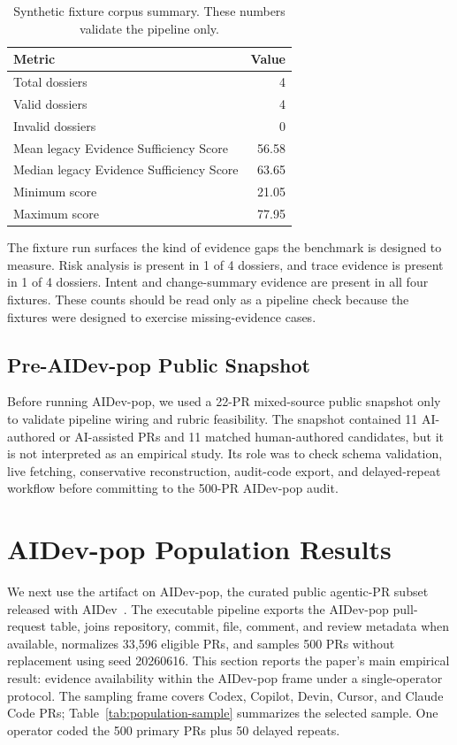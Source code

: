 \documentclass[10pt,conference]{IEEEtran}
\begin{document}
\begin{table}[t]
\centering
\caption{Synthetic fixture corpus summary. These numbers validate the pipeline only.}
\label{tab:seed-summary}
\footnotesize
\begin{tabular}{@{}lr@{}}
\toprule
Metric & Value \\
\midrule
Total dossiers & 4 \\
Valid dossiers & 4 \\
Invalid dossiers & 0 \\
Mean legacy Evidence Sufficiency Score & 56.58 \\
Median legacy Evidence Sufficiency Score & 63.65 \\
Minimum score & 21.05 \\
Maximum score & 77.95 \\
\bottomrule
\end{tabular}
\end{table}

The fixture run surfaces the kind of evidence gaps the benchmark is designed to measure.
Risk analysis is present in 1 of 4 dossiers, and trace evidence is present in 1 of 4 dossiers.
Intent and change-summary evidence are present in all four fixtures.
These counts should be read only as a pipeline check because the fixtures were designed to exercise missing-evidence cases.

\subsection{Pre-AIDev-pop Public Snapshot}

Before running AIDev-pop, we used a 22-PR mixed-source public snapshot only to validate pipeline wiring and rubric feasibility.
The snapshot contained 11 AI-authored or AI-assisted PRs and 11 matched human-authored candidates, but it is not interpreted as an empirical study.
Its role was to check schema validation, live fetching, conservative reconstruction, audit-code export, and delayed-repeat workflow before committing to the 500-PR AIDev-pop audit.

\section{AIDev-pop Population Results}

We next use the artifact on AIDev-pop, the curated public agentic-PR subset released with AIDev~\cite{aidev}.
The executable pipeline exports the AIDev-pop pull-request table, joins repository, commit, file, comment, and review metadata when available, normalizes 33,596 eligible PRs, and samples 500 PRs without replacement using seed 20260616.
This section reports the paper's main empirical result: evidence availability within the AIDev-pop frame under a single-operator protocol.
The sampling frame covers Codex, Copilot, Devin, Cursor, and Claude Code PRs; Table~\ref{tab:population-sample} summarizes the selected sample.
One operator coded the 500 primary PRs plus 50 delayed repeats.
\end{document}
